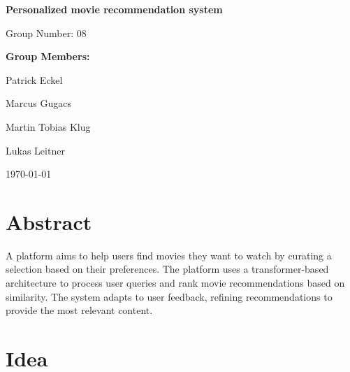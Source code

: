 \documentclass[12pt,a4paper]{article}
\begin{document}
  \begin{titlepage}
    \begin{center}
      \vspace*{2cm}
      {\huge\bfseries Personalized movie recommendation system\par}
      \vspace{2cm}
      {\Large Group Number: 08\par}
      \vspace{1.5cm}
      {\large\bfseries Group Members:\par}
      \vspace{0.5cm}
      {\large
      Patrick Eckel\par
      Marcus Gugacs\par
      Martin Tobias Klug\par
      Lukas Leitner\par
      }
      \vfill
      {\large \today\par}
    \end{center}
  \end{titlepage}

  \tableofcontents
  \newpage

  \section{Abstract}

  A platform aims to help users find movies they want to watch by curating a selection based on their preferences.
  The platform uses a transformer-based architecture to process user queries and rank movie recommendations based on similarity.
  The system adapts to user feedback, refining recommendations to provide the most relevant content.

  \section{Idea}
\end{document}
